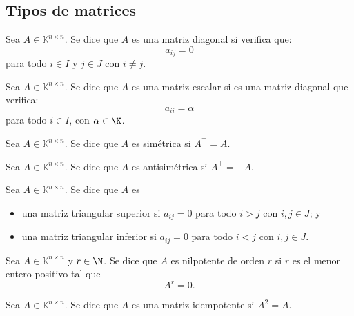 \documentclass[a4,11pt]{aleph-notas}
\begin{document}
\subsection{Tipos de matrices}

\begin{defi}
    Sea $A\in \mathbb{K}^{n \times n}$. Se dice que $A$ es una matriz diagonal si verifica que:
    \[ 
        a_{ij} = 0
    \]
    para todo $i\in I$ y $j\in J$ con $i\neq j$.
\end{defi}

\begin{defi}
    Sea $A\in \mathbb{K}^{n \times n}$. Se dice que $A$ es una matriz escalar si es una matriz diagonal que verifica:
    \[ 
        a_{ii} = \alpha
    \]
    para todo $i\in I$, con $\alpha\in\K$.
\end{defi}

\begin{defi}
    Sea $A\in \mathbb{K}^{n \times n}$. Se dice que $A$ es simétrica si $A^\intercal = A$.
\end{defi}

\begin{defi}
    Sea $A\in \mathbb{K}^{n \times n}$. Se dice que $A$ es antisimétrica si $A^\intercal = -A$.
\end{defi}

\begin{defi}
    Sea $A\in \mathbb{K}^{n \times n}$. Se dice que $A$ es
    \begin{itemize}
    \item 
        una matriz triangular superior si $a_{ij} = 0 $ para todo $i>j$ con $i,j \in J$; y
    \item 
        una matriz triangular inferior si $a_{ij} = 0 $ para todo $i<j$ con $i,j \in J$.
    \end{itemize}
\end{defi}

\begin{defi}
    Sea $A\in \mathbb{K}^{n \times n}$ y $r \in \N$. Se dice que $A$ es nilpotente de orden $r$ si $r$ es el menor entero positivo tal que
    \[ 
        A^r = 0.
    \]
\end{defi}

\begin{defi}
    Sea $A\in \mathbb{K}^{n \times n}$. Se dice que $A$ es una matriz idempotente si $A^2 = A$.
\end{defi}
\end{document}
